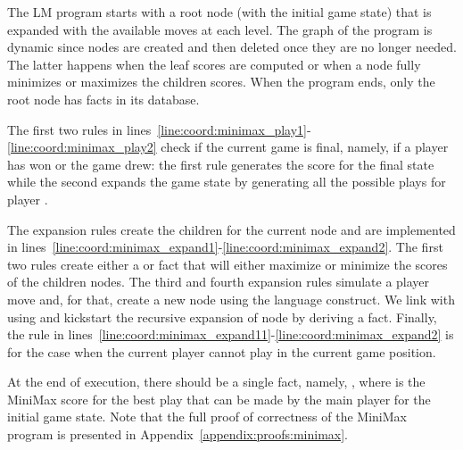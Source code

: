 The LM program starts with a root node (with the initial game state) that is
expanded with the available moves at each level. The graph of the program is
dynamic since nodes are created and then deleted once they are no longer needed.
The latter happens when the leaf scores are computed or when a node fully
minimizes or maximizes the children scores. When the program ends, only the root
node has facts in its database.

The first two rules in
lines~\ref{line:coord:minimax_play1}-\ref{line:coord:minimax_play2} check if the
current game is final, namely, if a player has won or the game drew: the first
rule generates the score for the final state while the second expands the game
state by generating all the possible plays for player .

The expansion rules create the children for the current node and are
implemented in
lines~\ref{line:coord:minimax_expand1}-\ref{line:coord:minimax_expand2}. The
first two rules create either a  or  fact that
will either maximize or minimize the scores of the children nodes.  The third
and fourth expansion rules simulate a player move and, for that, create a new
node  using the  language construct. We link  with
 using  and kickstart the recursive expansion of node
 by deriving a  fact. Finally, the rule in
lines~\ref{line:coord:minimax_expand11}-\ref{line:coord:minimax_expand2} is for
the case when the current player cannot play in the current game position.

At the end of execution, there should be a single fact, namely, , where  is the MiniMax score for the best play
 that can be made by the main player for the initial game state. Note
that the full proof of correctness of the MiniMax program is presented in
Appendix~\ref{appendix:proofs:minimax}.

